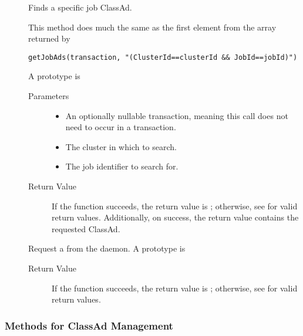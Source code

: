 \begin{description}
\item []
  Finds a specific job ClassAd. 

  This method does much the same as the first element from the array 
  returned by

\footnotesize
\begin{verbatim}
getJobAds(transaction, "(ClusterId==clusterId && JobId==jobId)")
\end{verbatim}
\normalsize

  A prototype is 


  \begin{description}
    \item[ Parameters]
    \begin{itemize}
      \item {} 
      An optionally nullable transaction, meaning this call does not 
      need to occur in a transaction. 
      \item {} The cluster in which to search.
      \item {} The job identifier to search for.
    \end{itemize}
    \item[ Return Value]
      If the function succeeds, the return value is ; 
      otherwise, see  for valid return values. Additionally,
      on success, the return value contains the requested ClassAd.
  \end{description}


\item []
  Request a  from the  daemon.
  A prototype is 


  \begin{description}
    \item[ Return Value]
      If the function succeeds, the return value is ; 
      otherwise, see  for valid return values.
  \end{description} 

   
\end{description}

\subsubsection{\label{WebService-ClassAdManagement} Methods for ClassAd Management}


